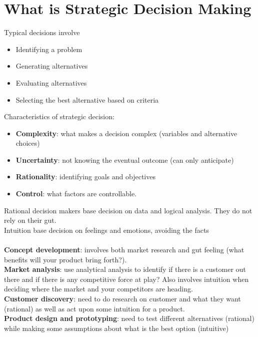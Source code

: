 \documentclass{article}
\begin{document}
    \section{What is Strategic Decision Making}
    Typical decisions involve
    \begin{itemize}
      \item Identifying a problem
      \item Generating alternatives
      \item Evaluating alternatives
      \item Selecting the best alternative based on criteria
    \end{itemize}
    Characteristics of strategic decision:
    \begin{itemize}
      \item \textbf{Complexity}: what makes a decision complex (variables and alternative choices)
      \item \textbf{Uncertainty}: not knowing the eventual outcome (can only anticipate)
      \item \textbf{Rationality}: identifying goals and objectives
      \item \textbf{Control}: what factors are controllable.
    \end{itemize}
    Rational decision makers base decision on data and logical analysis. They do not rely on their gut. \\
    Intuition base decision on feelings and emotions, avoiding the facts \\ \\
    \textbf{Concept development}: involves both market research and gut feeling (what benefits will your product bring forth?). \\
    \textbf{Market analysis}: use analytical analysis to identify if there is a customer out there and if there is any competitive force at play? Also involves intuition when deciding where the market and your competitors are heading. \\
    \textbf{Customer discovery}: need to do research on customer and what they want (rational) as well as act upon some intuition for a product. \\
    \textbf{Product design and prototyping}: need to test different alternatives (rational) while making some assumptions about what is the best option (intuitive)
\end{document}
